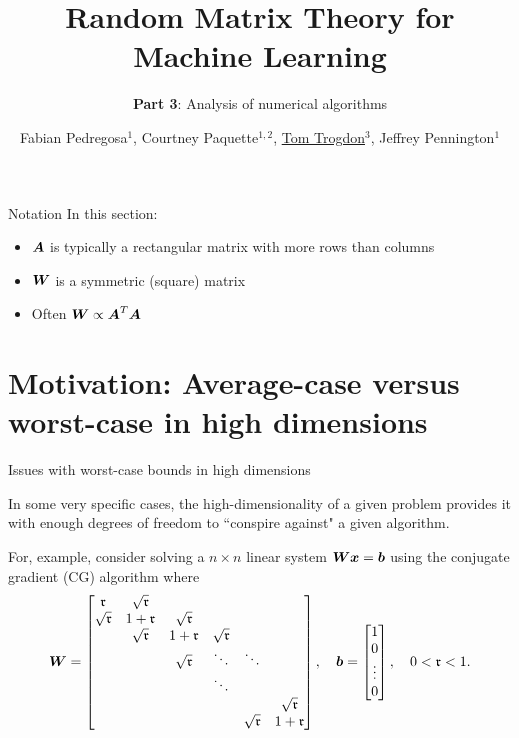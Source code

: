 \documentclass[9pt,aspectratio=169]{beamer}
\title{Random Matrix Theory for Machine Learning}
\subtitle{{\bfseries Part 3}: Analysis of numerical algorithms}
\date{}
\author{Fabian Pedregosa$^1$, Courtney Paquette$^{1, 2}$, \underline{Tom Trogdon}$^3$, Jeffrey Pennington$^1$}
\institute{
$^1$ Google Research\,, $^2$ McGill University\,, $^3$ University of Washington\\
\\
\url{https://random-matrix-learning.github.io}
}
\begin{document}
\maketitle

\begin{frame}{Notation}
In this section:
\begin{itemize}
    \item $\AA$ is typically a rectangular matrix with more rows than columns
    \item $\WW$ is a symmetric (square) matrix
    \item Often $\WW \propto \AA^T \AA$
\end{itemize}
    
\end{frame}

\section{Motivation:  Average-case versus worst-case in high dimensions}

\begin{frame}{Issues with worst-case bounds in high dimensions}

In some very specific cases, the high-dimensionality of a given problem provides it with enough degrees of freedom to ``conspire against" a given algorithm.

\pause

For, example, consider solving a $n \times n$ linear system $\WW \xx = \bb$ using the conjugate gradient (CG) algorithm  where 
\begin{align*}
    \WW = \begin{bmatrix} \mathfrak{r} & \sqrt{\mathfrak{r}} \\
    \sqrt{\mathfrak{r}} & 1 + \mathfrak{r} & \sqrt{\mathfrak{r}}\\
    & \sqrt{\mathfrak{r}} & 1 + \mathfrak{r} & \sqrt{\mathfrak{r}} \\
    && \sqrt{\mathfrak{r}}  & \ddots & \ddots \\
    &&& \ddots\\
    &&&&& \sqrt{\mathfrak{r}}\\
    &&&& \sqrt{\mathfrak{r}} & 1 + \mathfrak{r}\end{bmatrix}, \quad \bb = \begin{bmatrix} 1 \\ 0 \\ \vdots \\ 0 \end{bmatrix}, \quad 0 < \mathfrak{r} < 1.
\end{align*}
\end{frame}
\end{document}
